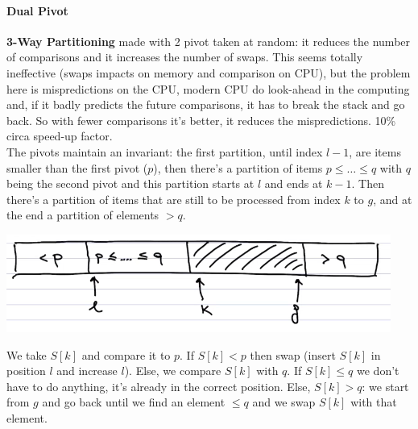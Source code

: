 \documentclass[10pt]{report}
\begin{document}
\paragraph{Dual Pivot} \textbf{3-Way Partitioning} made with 2 pivot taken at random: it reduces the number of comparisons and it increases the number of swaps. This seems totally ineffective (swaps impacts on memory and comparison on CPU), but the problem here is mispredictions on the CPU, modern CPU do look-ahead in the computing and, if it badly predicts the future comparisons, it has to break the stack and go back. So with fewer comparisons it's better, it reduces the mispredictions. 10\% circa speed-up factor.\\
The pivots maintain an invariant: the first partition, until index $l-1$, are items smaller than the first pivot ($p$), then there's a partition of items $p\leq \ldots \leq q$ with $q$ being the second pivot and this partition starts at $l$ and ends at $k-1$. Then there's a partition of items that are still to be processed from index $k$ to $g$, and at the end a partition of elements $> q$.
\begin{center}
	\includegraphics[scale=1]{7.png}
\end{center}
We take $S[k]$ and compare it to $p$. If $S[k]<p$ then swap (insert $S[k]$ in position $l$ and increase $l$). Else, we compare $S[k]$ with $q$. If $S[k]\leq q$ we don't have to do anything, it's already in the correct position. Else, $S[k] > q$: we start from $g$ and go back until we find an element $\leq q$ and we swap $S[k]$ with that element.
\end{document}
